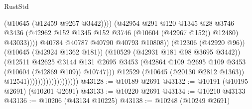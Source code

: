 \begin{lexlean}{RustStd}
\begin{coremodule}
                                                          (@10645 (@12459 @9267 @3442))))
                                                      (@42954
                                                        @291
                                                        @120
                                                        @1345
                                                        @28
                                                        @3746
                                                        @3436
                                                        (@42962
                                                          @152
                                                          @1345
                                                          @152
                                                          @3746
                                                          (@10604 (@42967 @152))
                                                          @12480)
                                                        @43033))))
                                                @40784
                                                @40787
                                                @40790
                                                @40793
                                                @10808))
                                            (@12306 (@42920 @96))
                                            (@10645 (@42924 @1362 @181))
                                            (@10529 (@42931 @181 @98 @3695 @3442))
                                            (@12511
                                              @42625
                                              @3144
                                              @131
                                              @2695
                                              @3453
                                              (@42864
                                                @109
                                                @2695
                                                @109
                                                @3453
                                                (@10604 (@42869 @109))
                                                @10747)))
                                          @12529
                                          (@10645 (@20130 @2812 @1363))
                                          @12541)))))))))))))))))))
@43128 := @10189 @2691
@43132 := @10191 (@10195 @2691) (@10201 @2691)
@43133 := @10220 @2691
@43134 := @10210 @43133
@43136 := @10206 (@43134 @10225)
@43138 := @10248 (@10249 @2691)

\end{coremodule}
\end{lexlean}
